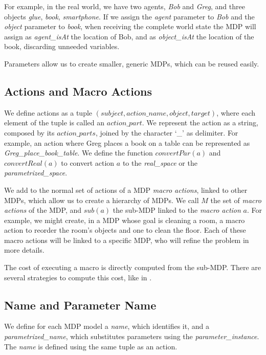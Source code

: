 For example, in the real world, we have two agents, \textit{Bob} and \textit{Greg}, and three objects \textit{glue}, \textit{book}, \textit{smartphone}. If we assign the \textit{agent} parameter to \textit{Bob} and the \textit{object} parameter to \textit{book}, when receiving the complete world state the MDP will assign as \textit{agent\_isAt} the location of Bob, and as \textit{object\_isAt} the location of the book, discarding unneeded variables.

Parameters allow us to create smaller, generic MDPs, which can be reused easily.


\subsection{Actions and Macro Actions}
We define actions as a tuple $(subject,action\_name,object,target)$, where each element of the tuple is called an $action\_part$.  We represent the action as a string, composed by its $action\_parts$, joined by the character `\_' as delimiter. For example, an action where Greg places a book on a table can be represented as \textit{Greg\_place\_book\_table}. We define the function $convertPar(a)$ and $convertReal(a)$ to convert action $a$ to the \textit{real\_space} or the \textit{parametrized\_space}.

We add to the normal set of actions of a MDP \textit{macro actions}, linked to other MDPs, which allow us to create a hierarchy of MDPs. We call $M$ the set of \textit{macro actions} of the MDP, and $sub(a)$ the sub-MDP linked to the \textit{macro action} $a$. For example, we might create, in a MDP whose goal is cleaning a room, a macro action to reorder the room's objects and one to clean the floor. Each of these macro actions will be linked to a specific MDP, who will refine the problem in more details.

The cost of executing a macro is directly computed from the sub-MDP. There are several strategies to compute this cost, like in \cite{dietterich2000hierarchical,hauskrecht1998hierarchical}.

\subsection{Name and Parameter Name}
We define for each MDP model a \textit{name}, which identifies it, and a \textit{parametrized\_name}, which substitutes parameters using the \textit{parameter\_instance}. The \textit{name} is defined using the same tuple as an action. 

